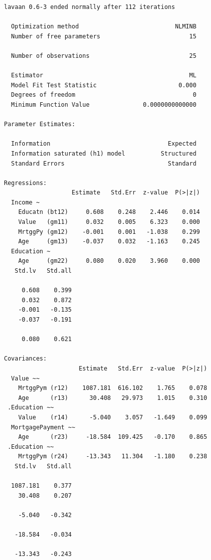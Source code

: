 \begin{verbatim}
lavaan 0.6-3 ended normally after 112 iterations

  Optimization method                           NLMINB
  Number of free parameters                         15

  Number of observations                            25

  Estimator                                         ML
  Model Fit Test Statistic                       0.000
  Degrees of freedom                                 0
  Minimum Function Value               0.0000000000000

Parameter Estimates:

  Information                                 Expected
  Information saturated (h1) model          Structured
  Standard Errors                             Standard

Regressions:
                   Estimate   Std.Err  z-value  P(>|z|)
  Income ~                                             
    Educatn (bt12)     0.608    0.248    2.446    0.014
    Value   (gm11)     0.032    0.005    6.323    0.000
    MrtggPy (gm12)    -0.001    0.001   -1.038    0.299
    Age     (gm13)    -0.037    0.032   -1.163    0.245
  Education ~                                          
    Age     (gm22)     0.080    0.020    3.960    0.000
   Std.lv   Std.all
                   
     0.608    0.399
     0.032    0.872
    -0.001   -0.135
    -0.037   -0.191
                   
     0.080    0.621

Covariances:
                     Estimate   Std.Err  z-value  P(>|z|)
  Value ~~                                               
    MrtggPym (r12)    1087.181  616.102    1.765    0.078
    Age      (r13)      30.408   29.973    1.015    0.310
 .Education ~~                                           
    Value    (r14)      -5.040    3.057   -1.649    0.099
  MortgagePayment ~~                                     
    Age      (r23)     -18.584  109.425   -0.170    0.865
 .Education ~~                                           
    MrtggPym (r24)     -13.343   11.304   -1.180    0.238
   Std.lv   Std.all
                   
  1087.181    0.377
    30.408    0.207
                   
    -5.040   -0.342
                   
   -18.584   -0.034
                   
   -13.343   -0.243


\end{verbatim}
